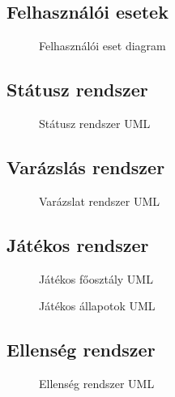 \subsection{Felhasználói esetek}
\begin{figure}[H]
	\noindent{}
	\caption{Felhasználói eset diagram}
	\label{useCase}
\end{figure}

\subsection{Státusz rendszer}

\begin{figure}[H]
	\noindent{}
	\caption{Státusz rendszer UML}
	\label{StatusSystem}
\end{figure}

\subsection{Varázslás rendszer}

\begin{figure}[H]
	\noindent{}
	\caption{Varázslat rendszer UML}
	\label{MagicSystem}
\end{figure}

\subsection{Játékos rendszer}

\begin{figure}[H]
	\noindent{}
	\caption{Játékos főosztály UML}
	\label{PlayerSystem1}
\end{figure}

\begin{figure}[H]
	\noindent{}
	\caption{Játékos állapotok UML}
	\label{PlayerSystem2}
\end{figure}

\subsection{Ellenség rendszer}

\begin{figure}[H]
	\noindent{}
	\caption{Ellenség rendszer UML}
	\label{EnemySystem}
\end{figure}

